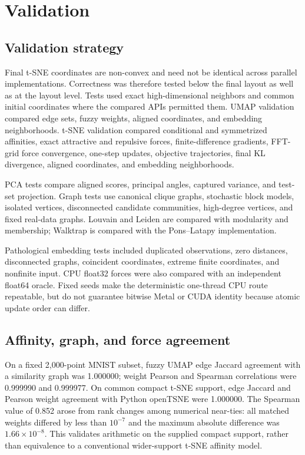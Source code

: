 \documentclass[article]{jss}
\begin{document}
\section{Validation}

\subsection{Validation strategy}

Final t-SNE coordinates are non-convex and need not be identical across
parallel implementations. Correctness was therefore tested below the final
layout as well as at the layout level. Tests used exact high-dimensional
neighbors and common initial coordinates where the compared APIs permitted
them. UMAP validation compared edge sets, fuzzy weights, aligned coordinates,
and embedding neighborhoods. t-SNE validation compared conditional and
symmetrized affinities, exact attractive and repulsive forces, finite-difference
gradients, FFT-grid force convergence, one-step updates, objective trajectories,
final KL divergence, aligned coordinates, and embedding neighborhoods.

PCA tests compare aligned scores, principal angles, captured variance, and
test-set projection. Graph tests use canonical clique graphs, stochastic block
models, isolated vertices, disconnected candidate communities, high-degree
vertices, and fixed real-data graphs. Louvain and Leiden are compared with
 modularity and membership; Walktrap is compared with the
 Pons--Latapy implementation.

Pathological embedding tests included duplicated observations, zero distances,
disconnected graphs, coincident coordinates, extreme finite coordinates, and
nonfinite input. CPU float32 forces were also compared with an independent
float64 oracle. Fixed seeds make the deterministic one-thread CPU route
repeatable, but do not guarantee bitwise Metal or CUDA identity because atomic
update order can differ.

\subsection{Affinity, graph, and force agreement}

On a fixed 2,000-point MNIST subset, fuzzy UMAP edge Jaccard agreement with a
 similarity graph was 1.000000; weight Pearson and Spearman
correlations were 0.999990 and 0.999977. On common compact t-SNE support,
edge Jaccard and Pearson weight agreement with Python openTSNE were 1.000000.
The Spearman value of 0.852 arose from rank changes among numerical near-ties:
all matched weights differed by less than $10^{-7}$ and the maximum absolute
difference was $1.66\times10^{-8}$. This validates arithmetic on the supplied
compact support, rather than equivalence to a conventional wider-support
t-SNE affinity model.
\end{document}
